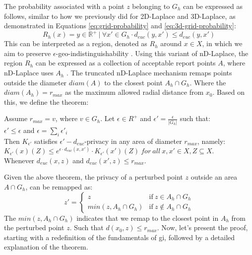 The probability associated with a point $z$ belonging to $G_h$ can be expressed as follows, similar to how we previously did for 2D-Laplace and 3D-Laplace, as demonstrated in Equations \ref{eq:grid-probability} and \ref{eq:3d-grid-probability}:
\begin{equation}
R_h(x) = { y \in \mathbb{R}^+ \ | \ \forall x' \in G_h \cdot d_{euc}(y, x') \leq d_{euc}(y, x') }
\end{equation}
This can be interpreted as a region, denoted as $R_h$ around $x \in X$, in which we aim to preserve $\epsilon$-geo-indistinguishability \citep{9646489}.
Using this variant of nD-Laplace, the region $R_h$ can be expressed as a collection of acceptable report points $A$, where nD-Laplace uses $A_h$ \citep{DBLP:journals/corr/abs-1212-1984}.
The truncated nD-Laplace mechanism remaps points outside the diameter $diam(A)$ to the closest point $A_h \cap G_h$. 
Where the $diam(A_h) = r_{max}$ as the maximum allowed radial distance from $x_0$. \newline
Based on this, we define the theorem:
\begin{theorem}
Assume  $r_{max} = v$, where $v \in G_h$. Let $\epsilon \in R^+$ and $\epsilon' = \frac{\epsilon}{|G_h|}$ such that: \\
  $\epsilon' \leq \epsilon$ and $\epsilon = \sum_i{\epsilon'_i}$ \\
  Then $K_{\epsilon'}$ satisfies $\epsilon'-d_{euc}$-privacy in any area of diameter $r_{max}$, namely: \\ 
  $K_{\epsilon'}(x)(Z) \leq e^{\epsilon \cdot d_{euc} (x, x')} \cdot K_{\epsilon'}(x')(Z) \ for \ all \ x, x' \in X, Z \subseteq X$.  \\
  Whenever $d_{euc}(x, z)$ and $d_{euc}(x', z) \leq r_{max}$.
  \label{theorem:nd-laplace-truncation}
\end{theorem}
Given the above theorem, the privacy of a perturbed point $z$ outside an area $A \cap G_h$, can be remapped as:
\begin{equation}
z' = 
\begin{cases}
        z & \text{if} \ z \in A_h \cap G_h \\ 
        min (z, A_h \cap G_h)  & \text{if} \ z \notin A_h \cap G_h
    \end{cases}    
\end{equation}
The $min(z, A_h \cap G_h)$ indicates that we remap to the closest point in $A_h$ from the perturbed point $z$. Such that $d(x_0, z) \leq r_{max}$.  \newline
Now, let's present the proof, starting with a redefinition of the fundamentals of \gls{gi}, followed by a detailed explanation of the theorem. \newline

